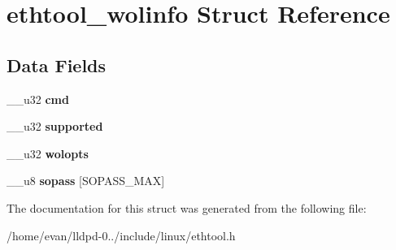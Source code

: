 \section{ethtool\-\_\-wolinfo \-Struct \-Reference}
\label{structethtool__wolinfo}
\subsection*{\-Data \-Fields}
\begin{DoxyCompactItemize}
\item 
\-\_\-\-\_\-u32 {\bfseries cmd}\label{structethtool__wolinfo_a66d231264d5aa36fd7d347e2c967769a}

\item 
\-\_\-\-\_\-u32 {\bfseries supported}\label{structethtool__wolinfo_a6e0c59f26af213bfbbdc2fb63651f5c6}

\item 
\-\_\-\-\_\-u32 {\bfseries wolopts}\label{structethtool__wolinfo_ad1ba6d388fbb7031d5d34782e6c3f845}

\item 
\-\_\-\-\_\-u8 {\bfseries sopass} [\-S\-O\-P\-A\-S\-S\-\_\-\-M\-A\-X]\label{structethtool__wolinfo_adf9624490c771af3d384702c7357332e}

\end{DoxyCompactItemize}


\-The documentation for this struct was generated from the following file\-:\begin{DoxyCompactItemize}
\item 
/home/evan/lldpd-\/0../include/linux/ethtool.\-h\end{DoxyCompactItemize}
